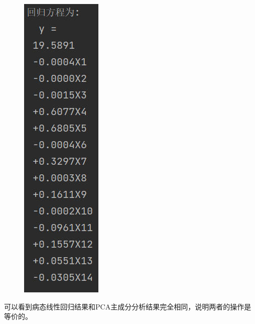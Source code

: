 \documentclass[UTF8]{ctexart}
\begin{document}
\begin{figure}[H]
  \centering
  \includegraphics[scale=0.3]{PCA回归方程.jpg}
\end{figure}

可以看到病态线性回归结果和PCA主成分分析结果完全相同，说明两者的操作是等价的。\\


\noindent \textbf{}\\
\end{document}
